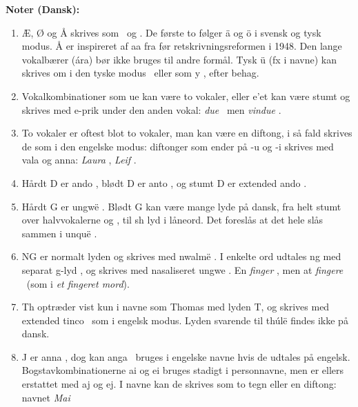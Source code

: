 \documentclass[a4paper]{article}
\begin{document}
{\Large \textbf{Noter (Dansk):}\par}

\begin{enumerate}
\item Æ, Ø og Å skrives som \Ttelco\TTinvertedthreedots\Ts
  \Ttelco\TTdoubleacute ~og \Taara\TTthreedots.  De første to følger
  \"a og \"o i svensk og tysk modus.  Å er inspireret af aa fra før
  retskrivningsreformen i 1948.  Den lange vokalbærer (\'ara) bør ikke
  bruges til andre formål.  Tysk \"u (fx i navne) kan skrives om i den
  tyske modus  \Ttelco\TTtwodots ~eller som y \Ttelco\TTbreve, efter
  behag.
\item Vokalkombinationer som ue kan være to vokaler, eller e'et kan
  være stumt og skrives med e-prik under den anden vokal: \emph{due}
  \Tando\Ttelco\TTleftcurl\Ttelco\TTacute ~men \emph{vindue}
  \Tampa\Tando\TTnasalizer\TTdot\Ttelco\TTleftcurl\TTdotbelow.
\item To vokaler er oftest blot to vokaler, man kan være en diftong, i
  så fald skrives de som i den engelske modus: diftonger som ender på
  -u og -i skrives med vala og anna: \emph{Laura}
  \Tlambe\Tvala\TTthreedots\Troomen\Ttelco\TTthreedots, \emph{Leif}
  \Tlambe\Tanna\TTacute\Tformen.
\item Hårdt D er ando \Tando, blødt D er anto \Tanto, og stumt D er
  extended ando \Textendedando.
\item Hårdt G er ungw\"e \Tungwe.  Blødt G kan være mange lyde på
  dansk, fra helt stumt over halvvokalerne \textipa{[I]} og
  \textipa{[U]}, til sh lyd \textipa{[S]} i låneord.  Det foreslås at
  det hele slås sammen i unqu\"e \Tunque.
\item NG er normalt lyden \textipa{[N]} og skrives med nwalm\"e
  \Tnwalme.  I enkelte ord udtales ng med separat g-lyd \textipa{[Ng]}, og skrives med
  nasaliseret ungwe \Tungwe\TTnasalizer.  En \emph{finger}
  \Tformen\Tnwalme\TTdot\Toore\TTacute, men at \emph{fingere}
  \Tformen\Tungwe\TTnasalizer\TTdot\Troomen\TTacute\Ttelco\TTacute
  ~(som i \emph{et fingeret mord}).
\item Th optræder vist kun i navne som Thomas med lyden T, og skrives
  med extended tinco \Textendedtinco ~som i engelsk modus.  Lyden
  svarende til th\'ul\"e \textipa{[T]} findes ikke på dansk.
\item J er anna \Tanna, dog kan anga \Tanga ~bruges i engelske navne
  hvis de udtales på engelsk.  Bogstavkombinationerne ai og ei bruges
  stadigt i personnavne, men er ellers erstattet med aj og ej.  I
  navne kan de skrives som to tegn eller en diftong: navnet \emph{Mai}

\end{enumerate}
\end{document}
